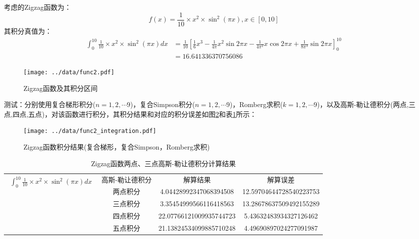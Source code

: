 \documentclass[12pt, onecolumn]{article}
\newcommand\normf{\fangsong}
\begin{document}
	\subsection{\normf{Zigzag函数}}
	考虑的Zigzag函数为：
	\begin{equation}
	f(x)=\frac{1}{10}\times x^2\times\sin^2(\pi x),x\in[0,10]
	\end{equation}
	其积分真值为：
	\begin{equation}
	\begin{aligned}
	\int_{0}^{10}\frac{1}{10}\times x^2\times\sin^2(\pi x)dx&=\frac{1}{10}\left[
		\frac{1}{6}x^3-\frac{1}{4\pi}x^2\sin 2\pi x-\frac{1}{4\pi^2}x\cos 2\pi x+\frac{1}{8\pi^3}\sin 2\pi x
		\right] _0^{10}
		\\&=16.641336370756086
	\end{aligned}
	\end{equation}
	\begin{figure}[h!]
	\centering
		\centering
		\texttt{[image: ../data/func2.pdf]}
	\caption{\normf Zigzag函数及其积分区间}
	\label{fig:Zigzag函数及其积分区间}
	\end{figure}
		测试：分别使用复合梯形积分($n=1,2,\cdots 9$)，复合Simpson积分($n=1,2,\cdots 9$)，Romberg求积($k=1,2,\cdots 9$)，以及高斯-勒让德积分(两点,三点,四点,五点)，对该函数进行积分，其积分结果和对应的积分误差如图\ref{fig:Zigzag函数积分结果}和表\ref{tab:Zigzag函数高斯-勒让德积分结果}所示：
	\begin{figure}[h!]
	\centering
		\centering
		\texttt{[image: ../data/func2\_integration.pdf]}
	\caption{\normf Zigzag函数积分结果(复合梯形，复合Simpson，Romberg求积)}
	\label{fig:Zigzag函数积分结果}
	\end{figure}
	
		
		\begin{table}[]
		\caption{\normf Zigzag函数两点、三点高斯-勒让德积分计算结果}
		\label{tab:Zigzag函数高斯-勒让德积分结果}
		\centering
		\vspace{2mm}
		\normf
\begin{tabular}{l|c|cc}
\toprule
\multirow{5}{*}{$\begin{aligned}
\int_{0}^{10}\frac{1}{10}\times x^2\times\sin^2(\pi x)dx
\end{aligned}$} & 高斯-勒让德积分 & 解算结果                    & 解算误差                    \\ \cmidrule{2-4} 
            & 两点积分     & 4.04428992347068394508  & 12.59704644728540223753 \\
            & 三点积分     & 3.35454999566116418563  & 13.28678637509492155289 \\
            & 四点积分     & 22.07766121009935744723 & 5.43632483934327126462  \\
            & 五点积分     & 21.13824534099885710248 & 4.49690897024277091987  \\ \bottomrule
\end{tabular}
		\end{table}
		
\end{document}
